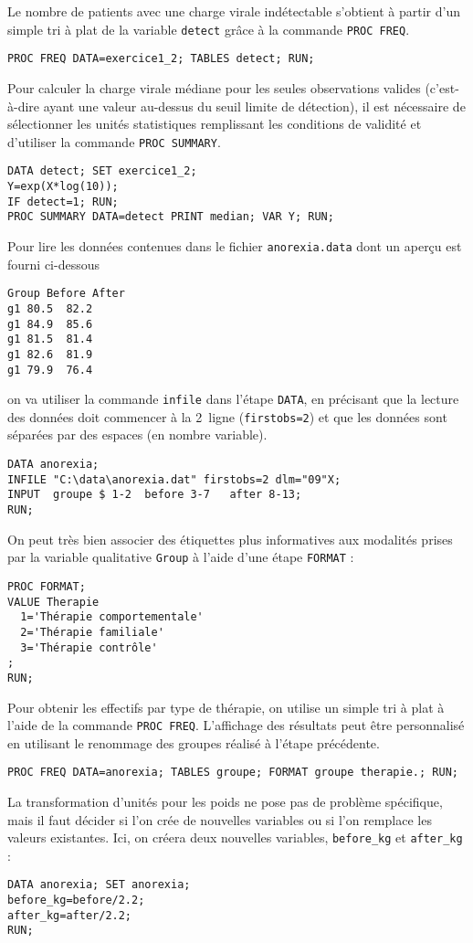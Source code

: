 Le nombre de patients avec une charge virale indétectable s'obtient à partir
d'un simple tri à plat de la variable \texttt{detect} grâce à la commande
\texttt{PROC FREQ}.
\begin{verbatim}
PROC FREQ DATA=exercice1_2; TABLES detect; RUN;
\end{verbatim}

Pour calculer la charge virale médiane pour les seules observations valides
(c'est-à-dire ayant une valeur au-dessus du seuil limite de détection), il
est nécessaire de sélectionner les unités statistiques remplissant les
conditions de validité et d'utiliser la commande \texttt{PROC SUMMARY}.
\begin{verbatim}
DATA detect; SET exercice1_2;
Y=exp(X*log(10));
IF detect=1; RUN;
PROC SUMMARY DATA=detect PRINT median; VAR Y; RUN;
\end{verbatim}
%
%
%
\soln{\ref{exo:8.3}}
Pour lire les données contenues dans le fichier \texttt{anorexia.data} dont
un aperçu est fourni ci-dessous
\begin{verbatim}
Group Before After
g1 80.5  82.2
g1 84.9  85.6
g1 81.5  81.4
g1 82.6  81.9
g1 79.9  76.4
\end{verbatim}
on va utiliser la commande \texttt{infile} dans l'étape \texttt{DATA}, en
précisant que la lecture des données doit commencer à la 2\ieme\ ligne
(\texttt{firstobs=2}) et que les données sont séparées par des espaces (en
nombre variable).
\begin{verbatim}
DATA anorexia;
INFILE "C:\data\anorexia.dat" firstobs=2 dlm="09"X;
INPUT  groupe $ 1-2  before 3-7   after 8-13;
RUN;
\end{verbatim}
On peut très bien associer des étiquettes plus informatives aux modalités
prises par la variable qualitative \texttt{Group} à l'aide d'une étape
\texttt{FORMAT} :
\begin{verbatim}
PROC FORMAT;
VALUE Therapie
  1='Thérapie comportementale'
  2='Thérapie familiale'
  3='Thérapie contrôle'
;
RUN;
\end{verbatim}

Pour obtenir les effectifs par type de thérapie, on utilise un simple tri à
plat à l'aide de la commande \texttt{PROC FREQ}. L'affichage des résultats
peut être personnalisé en utilisant le renommage des groupes réalisé à
l'étape précédente.
\begin{verbatim}
PROC FREQ DATA=anorexia; TABLES groupe; FORMAT groupe therapie.; RUN;
\end{verbatim}

La transformation d'unités pour les poids ne pose pas de problème
spécifique, mais il faut décider si l'on crée de nouvelles variables ou si
l'on remplace les valeurs existantes. Ici, on créera deux nouvelles
variables, \verb|before_kg| et \verb|after_kg| :
\begin{verbatim}
DATA anorexia; SET anorexia;
before_kg=before/2.2;
after_kg=after/2.2;
RUN;
\end{verbatim}


